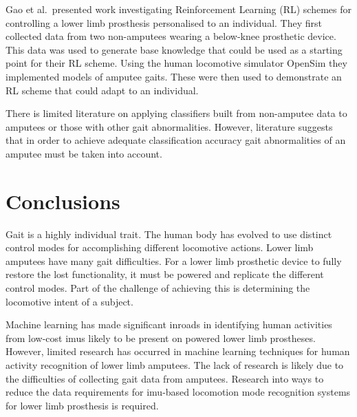 Gao et al.~presented work investigating Reinforcement Learning (RL) schemes for controlling a lower limb prosthesis personalised to an individual. They first collected data from two non-amputees wearing a below-knee prosthetic device. This data was used to generate base knowledge that could be used as a starting point for their RL scheme. Using the human locomotive simulator OpenSim they implemented models of amputee gaits. These were then used to demonstrate an RL scheme that could adapt to an individual.\cite{Gao2020a}

There is limited literature on applying classifiers built from non-amputee data to amputees or those with other gait abnormalities. However, literature suggests that in order to achieve adequate classification accuracy gait abnormalities of an amputee must be taken into account.

\section{Conclusions}
\label{sec:background-conclusion}
Gait is a highly individual trait. The human body has evolved to use distinct control modes for accomplishing different locomotive actions. Lower limb amputees have many gait difficulties. For a lower limb prosthetic device to fully restore the lost functionality, it must be powered and replicate the different control modes. Part of the challenge of achieving this is determining the locomotive intent of a subject.

Machine learning has made significant inroads in identifying human activities from low-cost \acrshort{imu}s likely to be present on powered lower limb prostheses. However, limited research has occurred in machine learning techniques for human activity recognition of lower limb amputees. The lack of research is likely due to the difficulties of collecting gait data from amputees. Research into ways to reduce the data requirements for \acrshort{imu}-based locomotion mode recognition systems for lower limb prosthesis is required.
